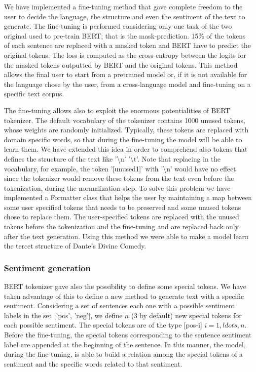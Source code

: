 \documentclass[10pt,twocolumn,letterpaper]{article}
\begin{document}
We have implemented a fine-tuning method that gave complete freedom to the user to decide the language,
the structure and even the sentiment of the text to generate.
The fine-tuning is performed considering only one task of the
two original used to pre-train BERT; that is the mask-prediction.
15\% of the tokens of each sentence are replaced with a masked token and
BERT have to predict the original tokens.
The loss is computed as the cross-entropy between the logits for the
masked tokens outputted by BERT and the original tokens.
This method allows the final user to start from a pretrained model or, if
it is not available for the language chose by the user, from a cross-language model
and fine-tuning on a specific text corpus.

The fine-tuning allows also to exploit the enormous potentialities of BERT tokenizer.
The default vocabulary of the tokenizer contains 1000 unused tokens,
whose weights are randomly initialized.
Typically, these tokens are replaced with domain specific words,
so that during the fine-tuning the model will be able to learn them.
We have extended this idea in order to comprehend also tokens that defines
the structure of the text like '\textbackslash n' '\textbackslash t'.
Note that replacing in the vocabulary, for example, the token '[unused1]'
with '\textbackslash n' would have no effect since the tokenizer would
remove these tokens from the text even before the tokenization,
during the normalization step.
To solve this problem we have implemented a Formatter class that helps
the user by maintaining a map between some user specified tokens that needs
to be preserved and some unused tokens chose to replace them.
The user-specified tokens are replaced with the unused tokens before
the tokenization and the fine-tuning and are replaced back only after the
text generation.
Using this method we were able to make a model learn the tercet structure
of Dante's Divine Comedy.

\subsubsection{Sentiment generation}
BERT tokenizer gave also the possibility to define some special tokens.
We have taken advantage of this to define a new method to generate text
with a specific sentiment.
Considering a set of sentences each one with a possible sentiment labels
in the set ['pos', 'neg'], we define $n$ (3 by default) new special tokens
for each possible sentiment.
The special tokens are of the type [pos-i] $i=1,ldots,n$.
Before the fine-tuning, the special tokens corresponding to the sentence
sentiment label are appended at the beginning of the sentence.
In this manner, the model, during the fine-tuning, is able to build a
relation among the special tokens of a sentiment and the specific words
related to that sentiment.
\end{document}
